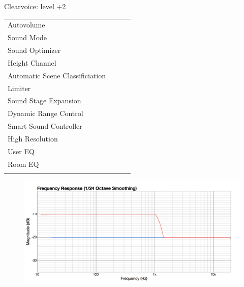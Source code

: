 \documentclass{beamer}
\begin{document}
\begin{frame}[t]{Clearvoice: level +2}
\begin{tiny}
\begin{tabular}{@{}lccc@{}}
				Autovolume & \color{black}{Off} & & \\
				Sound Mode & \color{black}{Off} & & \\
				Sound Optimizer & \color{black}{Off} & & \\
				Height Channel & \color{black}{Off} & & \\
				Automatic Scene Classificiation & \color{black}{Off} & & \\
				Limiter & \color{black}{Off} & & \\
				Sound Stage Expansion & \color{black}{Off} & & \\
				Dynamic Range Control & \color{black}{Off} & & \\
				Smart Sound Controller & \color{black}{Off} & & \\
				High Resolution & \color{black}{Off} & & \\
				User EQ & \color{black}{Off} & & \\
				Room EQ & \color{black}{Off} & & \\
				\color{blue}{OSD Volume} & \color{blue}{On} &  \color{blue}{Vol.40} & \\
				\midrule
			\end{tabular}
		\end{tiny}
		
		\begin{figure}[b]
			\includegraphics[height=0.32\textwidth]{figure/cv2.png}
		\end{figure}
		
	\end{frame}
	
\end{document}
